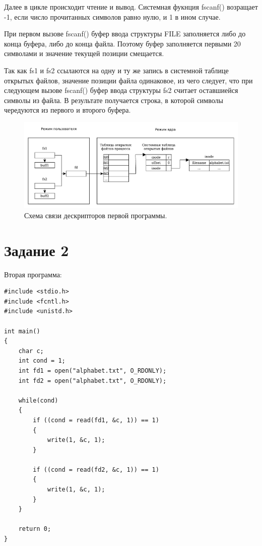 Далее в цикле происходит чтение и вывод.
Системная фукнция fscanf() возращает -1, если число прочитанных символов равно нулю, и 1 в ином случае.


При первом вызове fscanf() буфер ввода структуры FILE заполняется либо до конца буфера, либо до конца файла. Поэтому буфер заполняется первыми 20 символами и значение текущей позиции смещается.

Так как fs1 и fs2 ссылаются на одну и ту же запись в системной таблице открытых файлов, значение позиции файла одинаковое, из чего следует, что при следующем вызове fscanf() буфер ввода структуры fs2 считает оставшиейся символы из файла.
В результате получается строка, в которой символы чередуются из первого и второго буфера.

\begin{figure}[H]
    \centering
    \includegraphics[scale=0.6]{data/pdf/task_1.pdf}
    \caption{Схема связи дескрипторов первой программы.}
\end{figure}

\section{Задание \No{}2}

Вторая программа:
\lstset{language=c}
\begin{lstlisting}[caption=Текст программы второго задания]
#include <stdio.h>
#include <fcntl.h>
#include <unistd.h>

int main()
{
    char c;
    int cond = 1;
    int fd1 = open("alphabet.txt", O_RDONLY);
    int fd2 = open("alphabet.txt", O_RDONLY);

    while(cond)
    {
        if ((cond = read(fd1, &c, 1)) == 1)
        {
            write(1, &c, 1);
        }

        if ((cond = read(fd2, &c, 1)) == 1)
        {
            write(1, &c, 1);
        }
    }

    return 0;
}
\end{lstlisting}

